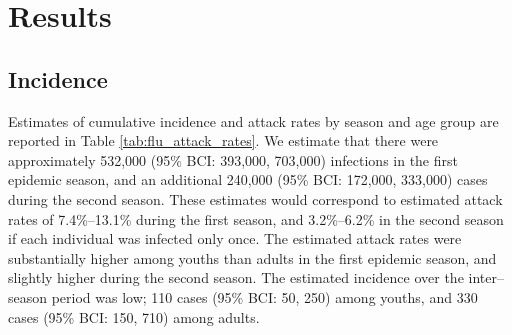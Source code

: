 \section{Results}
\label{sec:flu_results}

\subsection{Incidence}
\label{subsec:flu_incid_res}
Estimates of cumulative incidence and attack rates by season and age group are reported in Table \ref{tab:flu_attack_rates}. We estimate that there were approximately 532,000 (95\% BCI: 393,000, 703,000) infections in the first epidemic season, and an additional 240,000 (95\% BCI: 172,000, 333,000) cases during the second season. These estimates would correspond to estimated attack rates of 7.4\%--13.1\% during the first season, and 3.2\%--6.2\% in the second season if each individual was infected only once. The estimated attack rates were substantially higher among youths than adults in the first epidemic season, and slightly higher during the second season. The estimated incidence over the inter--season period was low; 110 cases (95\% BCI: 50, 250) among youths, and 330 cases (95\% BCI: 150, 710) among adults. 

